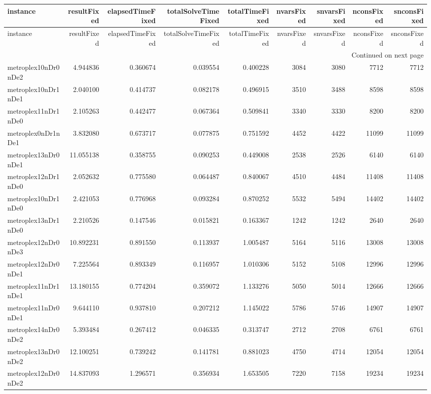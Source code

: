 
\begin{longtable}{|l|r|r|r|r|r|r|r|r|}
\toprule
instance & resultFixed & elapsedTimeFixed & totalSolveTimeFixed & totalTimeFixed & nvarsFixed & snvarsFixed & nconsFixed & snconsFixed \\
\midrule
\endfirsthead
\toprule
instance & resultFixed & elapsedTimeFixed & totalSolveTimeFixed & totalTimeFixed & nvarsFixed & snvarsFixed & nconsFixed & snconsFixed \\
\midrule
\endhead
\midrule
\multicolumn{9}{r}{Continued on next page} \\
\midrule
\endfoot
\bottomrule
\endlastfoot
metroplex10nDr0nDe2 & 4.944836 & 0.360674 & 0.039554 & 0.400228 & 3084 & 3080 & 7712 & 7712 \\
metroplex10nDr1nDe1 & 2.040100 & 0.414737 & 0.082178 & 0.496915 & 3510 & 3488 & 8598 & 8598 \\
metroplex11nDr1nDe0 & 2.105263 & 0.442477 & 0.067364 & 0.509841 & 3340 & 3330 & 8200 & 8200 \\
metroplex0nDr1nDe1 & 3.832080 & 0.673717 & 0.077875 & 0.751592 & 4452 & 4422 & 11099 & 11099 \\
metroplex13nDr0nDe1 & 11.055138 & 0.358755 & 0.090253 & 0.449008 & 2538 & 2526 & 6140 & 6140 \\
metroplex12nDr1nDe0 & 2.052632 & 0.775580 & 0.064487 & 0.840067 & 4510 & 4484 & 11408 & 11408 \\
metroplex10nDr1nDe0 & 2.421053 & 0.776968 & 0.093284 & 0.870252 & 5532 & 5494 & 14402 & 14402 \\
metroplex13nDr1nDe0 & 2.210526 & 0.147546 & 0.015821 & 0.163367 & 1242 & 1242 & 2640 & 2640 \\
metroplex12nDr0nDe3 & 10.892231 & 0.891550 & 0.113937 & 1.005487 & 5164 & 5116 & 13008 & 13008 \\
metroplex12nDr0nDe1 & 7.225564 & 0.893349 & 0.116957 & 1.010306 & 5152 & 5108 & 12996 & 12996 \\
metroplex11nDr1nDe1 & 13.180155 & 0.774204 & 0.359072 & 1.133276 & 5050 & 5014 & 12666 & 12666 \\
metroplex11nDr0nDe1 & 9.644110 & 0.937810 & 0.207212 & 1.145022 & 5786 & 5746 & 14907 & 14907 \\
metroplex14nDr0nDe2 & 5.393484 & 0.267412 & 0.046335 & 0.313747 & 2712 & 2708 & 6761 & 6761 \\
metroplex13nDr0nDe2 & 12.100251 & 0.739242 & 0.141781 & 0.881023 & 4750 & 4714 & 12054 & 12054 \\
metroplex12nDr0nDe2 & 14.837093 & 1.296571 & 0.356934 & 1.653505 & 7220 & 7158 & 19234 & 19234 \\

\end{longtable}
